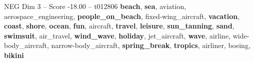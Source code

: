 \begin{textsample}{NEG Dim 3 – Score -18.00 – t012806}  \label{ex:f3_neg_018}
\textbf{beach}, \textbf{sea}, aviation, aerospace\_engineering, \textbf{people\_on\_beach}, fixed-wing\_aircraft, \textbf{vacation}, \textbf{coast}, \textbf{shore}, \textbf{ocean}, \textbf{fun}, aircraft, \textbf{travel}, \textbf{leisure}, \textbf{sun\_tanning}, \textbf{sand}, \textbf{swimsuit}, air\_travel, \textbf{wind\_wave}, \textbf{holiday}, jet\_aircraft, \textbf{wave}, airline, wide-body\_aircraft, narrow-body\_aircraft, \textbf{spring\_break}, \textbf{tropics}, airliner, boeing, \textbf{bikini}

\end{textsample}
